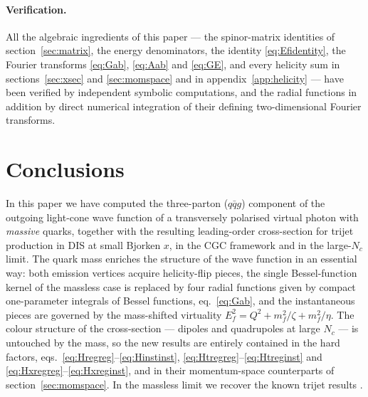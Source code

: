 \documentclass[11pt,a4paper]{article}
\numberwithin{equation}{section}
\begin{document}
\paragraph{Verification.} All the algebraic ingredients of this paper --- the spinor-matrix
identities of section~\ref{sec:matrix}, the energy denominators, the identity
\eqref{eq:Efidentity}, the Fourier transforms \eqref{eq:Gab}, \eqref{eq:Aab} and
\eqref{eq:GE}, and every helicity sum in sections~\ref{sec:xsec} and \ref{sec:momspace} and
in appendix~\ref{app:helicity} --- have been verified by independent symbolic computations,
and the radial functions in addition by direct numerical integration of their defining
two-dimensional Fourier transforms.

\section{Conclusions}
\label{sec:conclusions}

In this paper we have computed the three-parton ($q\bar qg$) component of the outgoing
light-cone wave function of a transversely polarised virtual photon with \emph{massive}
quarks, together with the resulting leading-order cross-section for trijet production in DIS
at small Bjorken $x$, in the CGC framework and in the large-$N_c$ limit. The quark mass
enriches the structure of the wave function in an essential way: both emission vertices
acquire helicity-flip pieces, the single Bessel-function kernel of the massless case is
replaced by four radial functions given by compact one-parameter integrals of Bessel
functions, eq.~\eqref{eq:Gab}, and the instantaneous pieces are governed by the mass-shifted
virtuality $E_f^2=Q^2+m_f^2/\zeta+m_f^2/\eta$. The colour structure of the cross-section ---
dipoles and quadrupoles at large $N_c$ --- is untouched by the mass, so the new results are
entirely contained in the hard factors, eqs.~\eqref{eq:Hregreg}--\eqref{eq:Hinstinst},
\eqref{eq:Htregreg}--\eqref{eq:Htreginst} and \eqref{eq:Hxregreg}--\eqref{eq:Hxreginst}, and
in their momentum-space counterparts of section~\ref{sec:momspace}. In the massless limit we
recover the known trijet results \cite{Iancu:2022gpw,Ayala:2016lhd,Ayala:2017rmh}.
\end{document}
